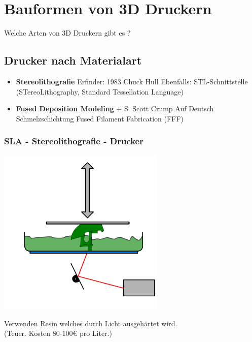 \section{Bauformen von 3D Druckern}
Welche Arten von 3D Druckern gibt es ?
\subsection{Drucker nach Materialart}
\begin{itemize}
  \item \textbf{}
  \subitem \textbf{Stereolithografie}
  \subitem Erfinder: 1983  Chuck Hull
  \subitem Ebenfalls: STL-Schnittstelle
  \subitem (STereoLithography, Standard Tessellation Language)
  \item \textbf{}
  \subitem \textbf{Fused Deposition Modeling}
  + S. Scott Crump
  \subitem Auf Deutsch Schmelzschichtung
  \subitem Fused Filament Fabrication (FFF)
\end{itemize}


\newpage


\subsubsection{SLA - Stereolithografie - Drucker}

\begin{center}
  \vspace{-0.5cm}
  \includegraphics[width=0.6\textwidth, trim = 0px 45px 0px 10px, clip]{./bilder/SLA.pdf}
\end{center}

Verwenden Resin welches durch Licht ausgehärtet wird. \\
(Teuer. Kosten 80-100€ pro Liter.)



